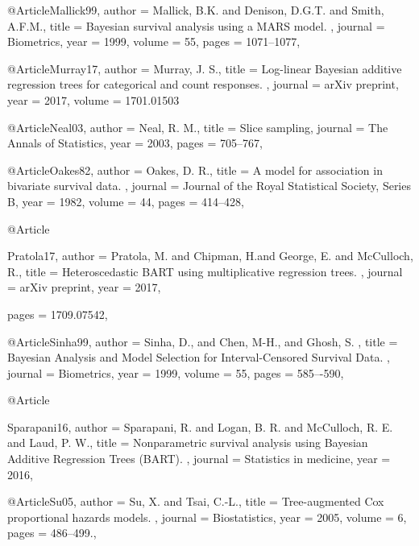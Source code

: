  


@Article{Mallick99,
   author =   {Mallick, B.K. and Denison, D.G.T. and Smith, A.F.M.},
   title =    { Bayesian survival analysis using a MARS model. },
   journal =      {Biometrics},
   year =     {1999},
   volume =   {55},
   pages =    {1071--1077},
 }

 


@Article{Murray17,
   author =   {Murray, J. S.},
   title =    { Log-linear Bayesian additive regression trees for categorical and count responses. },
   journal =      {arXiv preprint},
   year =     {2017},
   volume =   {1701.01503}
 }

 

@Article{Neal03,
   author =   {Neal, R. M.},
   title =    {Slice sampling},
   journal =      {The Annals of Statistics},
   year =     {2003},
   pages =    {705--767},
 }
 
@Article{Oakes82,
   author =   {Oakes, D. R.},
   title =    { A model for association in bivariate survival data. },
   journal =      {Journal of the Royal
 Statistical Society, Series B},
   year =     {1982},
   volume =   {44},
   pages =    {414--428},
 }
 


@Article{Pratola17,
   author =   {Pratola, M. and Chipman, H.and George, E. and McCulloch, R.},
   title =    {Heteroscedastic BART using multiplicative regression trees.  },
   journal =      {arXiv preprint},
   year =     {2017},
   
   pages =    {1709.07542},
 }

 


@Article{Sinha99,
   author =   {Sinha, D., and Chen, M-H., and 
Ghosh, S. },
   title =    { Bayesian Analysis and Model Selection for Interval-Censored Survival Data.  },
   journal =      {Biometrics},
   year =     {1999},
   volume =   {55},
   pages =    {585–-590},
 }

 


@Article{Sparapani16,
   author =   { Sparapani, R. and Logan, B. R. and McCulloch, R. E. and Laud, P. W.},
   title =    { Nonparametric survival analysis using Bayesian Additive Regression Trees (BART). },
   journal =      {Statistics in medicine},
   year =     {2016},
  
 }

 


@Article{Su05,
   author =   { Su, X. and Tsai, C.-L.},
   title =    { Tree-augmented Cox proportional hazards models.  },
   journal =      {Biostatistics},
   year =     {2005},
   volume =   {6},
   pages =    {486--499.},
 }

